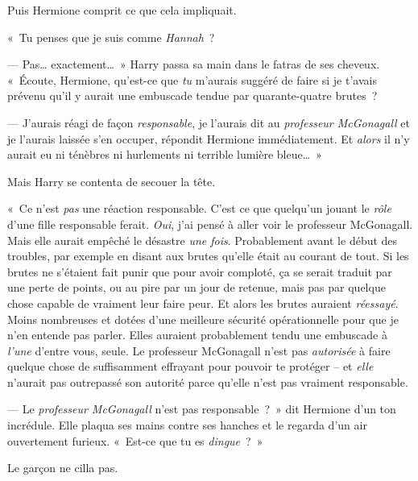 Puis Hermione comprit ce que cela impliquait.

«~Tu penses que je suis comme \emph{Hannah}~?

--- Pas… exactement…~»
Harry passa sa main dans le fatras de ses cheveux.
«~Écoute, Hermione, qu'est-ce que \emph{tu} m'aurais suggéré de faire si je t'avais prévenu qu'il y aurait une embuscade tendue par quarante-quatre brutes~?

--- J'aurais réagi de façon \emph{responsable}, je l'aurais dit au \emph{professeur McGonagall} et je l'aurais laissée s'en occuper, répondit Hermione immédiatement.
Et \emph{alors} il n'y aurait eu ni ténèbres ni hurlements ni terrible lumière bleue…~»

Mais Harry se contenta de secouer la tête.

«~Ce n'est \emph{pas} une réaction responsable.
C'est ce que quelqu'un jouant le \emph{rôle} d'une fille responsable ferait.
\emph{Oui}, j'ai pensé à aller voir le professeur McGonagall.
Mais elle aurait empêché le désastre \emph{une fois}.
Probablement avant le début des troubles, par exemple en disant aux brutes qu'elle était au courant de tout.
Si les brutes ne s'étaient fait punir que pour avoir comploté, ça se serait traduit par une perte de points, ou au pire par un jour de retenue, mais pas par quelque chose capable de vraiment leur faire peur.
Et alors les brutes auraient \emph{réessayé}.
Moins nombreuses et dotées d'une meilleure sécurité opérationnelle pour que je n'en entende pas parler.
Elles auraient probablement tendu une embuscade à \emph{l'une} d'entre vous, seule.
Le professeur McGonagall n'est pas \emph{autorisée} à faire quelque chose de suffisamment effrayant pour pouvoir te protéger -- et \emph{elle} n'aurait pas outrepassé son autorité parce qu'elle n'est pas vraiment responsable.

--- Le \emph{professeur McGonagall} n'est pas responsable~?~»
dit Hermione d'un ton incrédule.
Elle plaqua ses mains contre ses hanches et le regarda d'un air ouvertement furieux.
«~Est-ce que tu es \emph{dingue}~?~»

Le garçon ne cilla pas.

